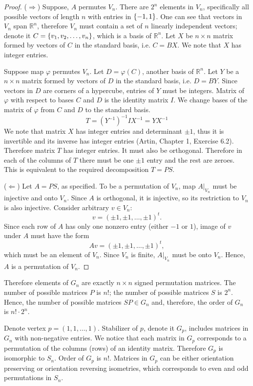 \documentclass{article}
\theoremstyle{definition}
\newcommand{\R}{\mathbb{R}}
\DeclarePairedDelimiter\set{\{}{\}}
\newcommand{\restrict}[1]{ \big|_{#1} }
\begin{document}
\begin{proof}

($\Longrightarrow$)
Suppose, $A$ permutes $V_n$.
There are $2^n$ elements in $V_n$, specifically all possible vectors of length $n$ with entries in $\set{-1,1}$.
One can see that vectors in $V_n$ span $\R^n$, therefore $V_n$ must contain a set of $n$ linearly independent vectors; denote it $C = \set{v_1, v_2, \dots, v_n}$, which is a basis of $\R^n$.
Let $X$ be $n \times n$ matrix formed by vectors of $C$ in the standard basis, i.e. $C = BX$.
We note that $X$ has integer entries.

Suppose map $\varphi$ permutes $V_n$.
Let $D = \varphi(C)$, another basis of $\R^n$.
Let $Y$ be a $n \times n$ matrix formed by vectors of $D$ in the standard basis, i.e. $D = BY$.
Since vectors in $D$ are corners of a hypercube, entries of $Y$ must be integers.
Matrix of $\varphi$ with respect to bases $C$ and $D$ is the identity matrix $I$.
We change bases of the matrix of $\varphi$ from $C$ and $D$ to the standard basis.
\[
	T =
	(Y^{-1})^{-1} I X^{-1} =
	Y X^{-1}
\]
We note that matrix $X$ has integer entries and determinant $\pm 1$, thus it is invertible and its inverse has integer entries (Artin, Chapter 1, Exercise 6.2).
Therefore matrix $T$ has integer entries.
It must also be orthogonal.
Therefore in each of the columns of $T$ there must be one $\pm 1$ entry and the rest are zeroes.
This is equivalent to the required decomposition $T = PS$.

($\Longleftarrow$)
Let $A = PS$, as specified.
To be a permutation of $V_n$, map $A \restrict{V_n}$ must be injective and onto $V_n$.
Since $A$ is orthogonal, it is injective, so its restriction to $V_n$ is also injective.
Consider arbitrary $v \in V_n$:
\[ v = (\pm 1, \pm 1, \dots, \pm 1)^t. \]
Since each row of $A$ has only one nonzero entry (either $-1$ or $1$), image of $v$ under $A$ must have the form 
\[ Av = (\pm 1, \pm 1, \dots, \pm 1)^t, \]
which must be an element of $V_n$.
Since $V_n$ is finite, $A \restrict{V_n}$ must be onto $V_n$.
Hence, $A$ is a permutation of $V_n$.

\end{proof}

Therefore elements of $G_n$ are exactly $n \times n$ signed permutation matrices.
The number of possible matrices $P$ is $n!$; the number of possible matrices $S$ is $2^n$.
Hence, the number of possible matrices $SP \in G_n$ and, therefore, the order of $G_n$ is $n! \cdot 2^n $.

Denote vertex $p = (1,1,\dots,1)$.
Stabilizer of $p$, denote it $G_p$, includes matrices in $G_n$ with non-negative entries.
We notice that each matrix in $G_p$ corresponds to a permutation of the columns (rows) of an identity matrix.
Therefore $G_p$ is isomorphic to $S_n$.
Order of $G_p$ is $n!$.
Matrices in $G_p$ can be either orientation preserving or orientation reversing isometries, which corresponds to even and odd permutations in $S_n$.
\end{document}
